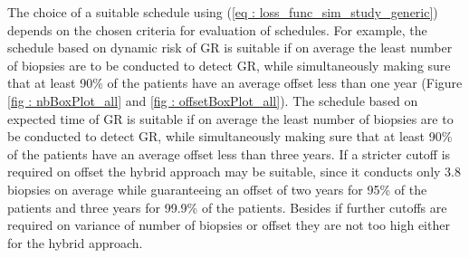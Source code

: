 The choice of a suitable schedule using (\ref{eq : loss_func_sim_study_generic}) depends on the chosen criteria for evaluation of schedules. For example, the schedule based on dynamic risk of GR is suitable if on average the least number of biopsies are to be conducted to detect GR, while simultaneously making sure that at least 90\% of the patients have an average offset less than one year (Figure \ref{fig : nbBoxPlot_all} and \ref{fig : offsetBoxPlot_all}). The schedule based on expected time of GR is suitable if on average the least number of biopsies are to be conducted to detect GR, while simultaneously making sure that at least 90\% of the patients have an average offset less than three years. If a stricter cutoff is required on offset the hybrid approach may be suitable, since it conducts only 3.8 biopsies on average while guaranteeing an offset of two years for 95\% of the patients and three years for 99.9\% of the patients. Besides if further cutoffs are required on variance of number of biopsies or offset they are not too high either for the hybrid approach.